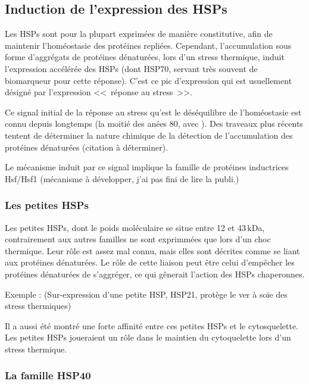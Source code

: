 
\subsection{Induction de l'expression des HSPs}

Les HSPs sont pour la plupart exprimées de manière constitutive, afin de maintenir l'homéostasie des protéines repliées.
Cependant, l'accumulation sous forme d'aggrégats de protéines dénaturées, lors d'un stress thermique, induit l'expression accélérée des HSPs (dont HSP70, servant très souvent de biomarqueur pour cette réponse).
C'est ce pic d'expression qui est usuellement désigné par l'expression <<~réponse au stress~>>.

Ce signal initial de la réponse au stress qu'est le déséquilibre de l'homéostasie est connu depuis longtemps (la moitié des anées 80, avec \citet{ananthan1986}).
Des traveaux plus récents tentent de déterminer la nature chimique de la détection de l'accumulation des protéines dénaturées (citation à déterminer).

Le mécanisme induit par ce signal implique la famille de protéines inductrices Hsf/Hsf1 \citet{voellmy2004} (mécanisme à développer, j'ai pas fini de lire la publi.)

\subsubsection{Les petites HSPs} %
\label{ssub:les_petites_hsps}

  Les petites HSPs, dont le poids moléculaire se situe entre 12 et 43\,kDa,
  contrairement aux autres familles ne sont exprimmées que lors d'un choc
  thermique. Leur rôle est assez mal connu,
  mais elles sont décrites comme se liant aux protéines dénaturées.
  Le rôle de cette liaison peut être celui d'empêcher les protéines dénaturées
  de s'aggréger, ce qui gênerait l'action des HSPs chaperonnes.

  Exemple : \cite{liu2013} (Sur-expression d'une petite HSP, HSP21, protège le
  ver à soie des stress thermiques)

  Il a aussi été montré une forte affinité entre ces petites HSPs et le cytosquelette.
  Les petites HSPs joueraient un rôle dans le maintien du cytoquelette lors d'un stress thermique.


\subsubsection{La famille HSP40} %
\label{ssub:la_famille_hsp40}

